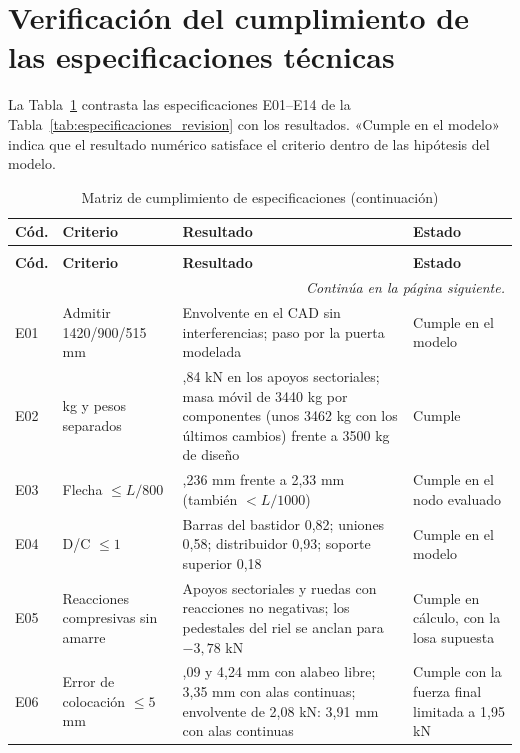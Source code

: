 \section{Verificación del cumplimiento de las especificaciones técnicas}
\label{sec:verificacion-especificaciones}

La Tabla~\ref{tab:cumplimiento-especificaciones} contrasta las especificaciones E01--E14 de la Tabla~\ref{tab:especificaciones_revision} con los resultados. «Cumple en el modelo» indica que el resultado numérico satisface el criterio dentro de las hipótesis del modelo.

\begingroup
\small\singlespacing
\setlength{\tabcolsep}{3pt}
\renewcommand{\arraystretch}{1.08}
\begin{longtable}{@{}p{0.75cm}>{\raggedright\arraybackslash}p{3.1cm}>{\raggedright\arraybackslash}p{4.9cm}>{\raggedright\arraybackslash}p{\dimexpr\textwidth-8.75cm-8\tabcolsep\relax}@{}}
\caption{Matriz de cumplimiento de especificaciones}\label{tab:cumplimiento-especificaciones}\\
\toprule
\textbf{Cód.} & \textbf{Criterio} & \textbf{Resultado} & \textbf{Estado}\\
\midrule\endfirsthead
\caption[]{Matriz de cumplimiento de especificaciones (continuación)}\\
\toprule
\textbf{Cód.} & \textbf{Criterio} & \textbf{Resultado} & \textbf{Estado}\\
\midrule\endhead
\midrule\multicolumn{4}{r}{\textit{Continúa en la página siguiente.}}\\\endfoot
\bottomrule\endlastfoot
E01 & Admitir 1420/900/515 mm & Envolvente en el CAD sin interferencias; paso por la puerta modelada & Cumple en el modelo\\
E02 & 3032 kg y pesos separados & 29,84 kN en los apoyos sectoriales; masa móvil de 3440 kg por componentes (unos 3462 kg con los últimos cambios) frente a 3500 kg de diseño & Cumple\\
E03 & Flecha $\leq L/800$ & 1,236 mm frente a 2,33 mm (también $<L/1000$) & Cumple en el nodo evaluado\\
E04 & D/C $\leq1$ & Barras del bastidor 0,82; uniones 0,58; distribuidor 0,93; soporte superior 0,18 & Cumple en el modelo\\
E05 & Reacciones compresivas sin amarre & Apoyos sectoriales y ruedas con reacciones no negativas; los pedestales del riel se anclan para $-3{,}78$ kN & Cumple en cálculo, con la losa supuesta\\
E06 & Error de colocación $\leq5$ mm & 4,09 y 4,24 mm con alabeo libre; 3,35 mm con alas continuas; envolvente de 2,08 kN: 3,91 mm con alas continuas & Cumple con la fuerza final limitada a 1,95 kN\\

\end{longtable}
